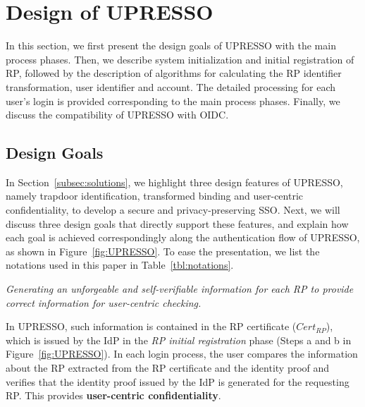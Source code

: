 ﻿\section{Design of UPRESSO}
\label{sec:UPRESSO}
In this section, we first present the design goals of UPRESSO with the main process phases. Then, we describe system initialization and initial registration of RP, followed by the description of algorithms for calculating the RP identifier transformation, user identifier and account. The detailed processing for each user's login is provided corresponding to the main process phases. Finally, we discuss the compatibility of UPRESSO with OIDC.

\subsection{Design Goals}
\label{subsec:overview}

In Section~\ref{subsec:solutions}, we highlight three design features of UPRESSO, namely trapdoor identification, transformed binding and user-centric confidentiality, to develop a secure and privacy-preserving SSO.
Next, we will discuss three design goals that directly support these features, and explain how each goal is achieved correspondingly along the authentication flow of UPRESSO, as shown in Figure~\ref{fig:UPRESSO}.
To ease the presentation, we list the notations used in this paper in Table~\ref{tbl:notations}.

\vspace{1mm} {\em Generating an unforgeable and self-verifiable information for each RP to provide correct information for user-centric checking.}

In UPRESSO, such information is contained in the RP certificate ($Cert_{RP}$), which is issued by the IdP in the \emph{RP initial registration} phase (Steps a and b in Figure~\ref{fig:UPRESSO}). In each login process, the user compares the information about the RP extracted from the RP certificate and the identity proof and verifies that the identity proof issued by the IdP is generated for the requesting RP. This provides \textbf{user-centric confidentiality}.

